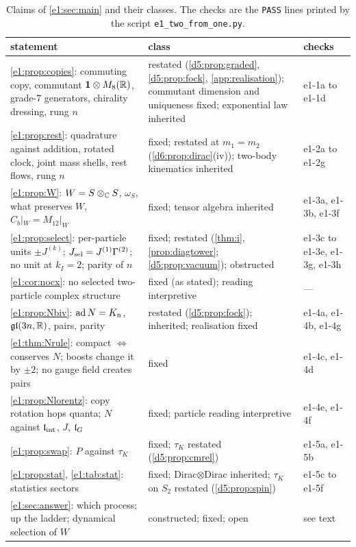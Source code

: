 \begin{table}[t]
\centering
\footnotesize
\begin{tabular}{@{}>{\raggedright\arraybackslash}p{8.3cm}>{\raggedright\arraybackslash}p{4.4cm}>{\raggedright\arraybackslash}p{2.2cm}@{}}
\toprule
statement & class & checks\\
\midrule
\cref{e1:prop:copies}: commuting copy, commutant $\mathbf 1\otimes M_8(\mathbb{R})$, grade-$7$ generators, chirality dressing, rung $n$ & restated (\cref{d5:prop:graded}, \cref{d5:prop:fock}, \cref{app:realisation}); commutant dimension and uniqueness fixed; exponential law inherited & e1-1a to e1-1d\\
\cref{e1:prop:rest}: quadrature against addition, rotated clock, joint mass shells, rest flows, rung $n$ & fixed; restated at $m_1=m_2$ (\cref{d6:prop:dirac}(iv)); two-body kinematics inherited & e1-2a to e1-2g\\
\cref{e1:prop:W}: $W=S\otimes_{\mathbb{C}} S$, $\omega_S$, what preserves $W$, $C_b|_W=M_{12}|_W$ & fixed; tensor algebra inherited & e1-3a, e1-3b, e1-3f\\
\cref{e1:prop:select}: per-particle units $\pm J^{(k)}$; $J_{\rm sel}=J^{(1)}\Gamma^{(2)}$; no unit at $k_I=2$; parity of $n$ & fixed; restated (\cref{thm:i}, \cref{prop:diagtower}; \cref{d5:prop:vacuum}); obstructed & e1-3c to e1-3e, e1-3g, e1-3h\\
\cref{e1:cor:nocx}: no selected two-particle complex structure & fixed (as stated); reading interpretive & ---\\
\cref{e1:prop:Nbiv}: $\operatorname{ad} N=K_n$, $\mathfrak{gl}(3n,\mathbb{R})$, pairs, parity & restated (\cref{d5:prop:fock}); inherited; realisation fixed & e1-4a, e1-4b, e1-4g\\
\cref{e1:thm:Nrule}: compact $\Leftrightarrow$ conserves $N$; boosts change it by $\pm2$; no gauge field creates pairs & fixed & e1-4c, e1-4d\\
\cref{e1:prop:Nlorentz}: copy rotation hops quanta; $N$ against $\mathfrak l_{\rm int}$, $J$, $\mathfrak l_G$ & fixed; particle reading interpretive & e1-4e, e1-4f\\
\cref{e1:prop:swap}: $P$ against $\tau_K$ & fixed; $\tau_K$ restated (\cref{d5:prop:cmrel}) & e1-5a, e1-5b\\
\cref{e1:prop:stat}, \cref{e1:tab:stat}: statistics sectors & fixed; Dirac$\otimes$Dirac inherited; $\tau_K$ on $S_2$ restated (\cref{d5:prop:spin}) & e1-5c to e1-5f\\
\cref{e1:sec:answer}: which process; up the ladder; dynamical selection of $W$ & constructed; fixed; open & see text\\
\bottomrule
\end{tabular}
\caption{Claims of \cref{e1:sec:main} and their classes. The checks are the \texttt{PASS} lines printed by the script
\texttt{e1\_two\_from\_one.py}.}
\label{e1:tab:claims}
\end{table}

